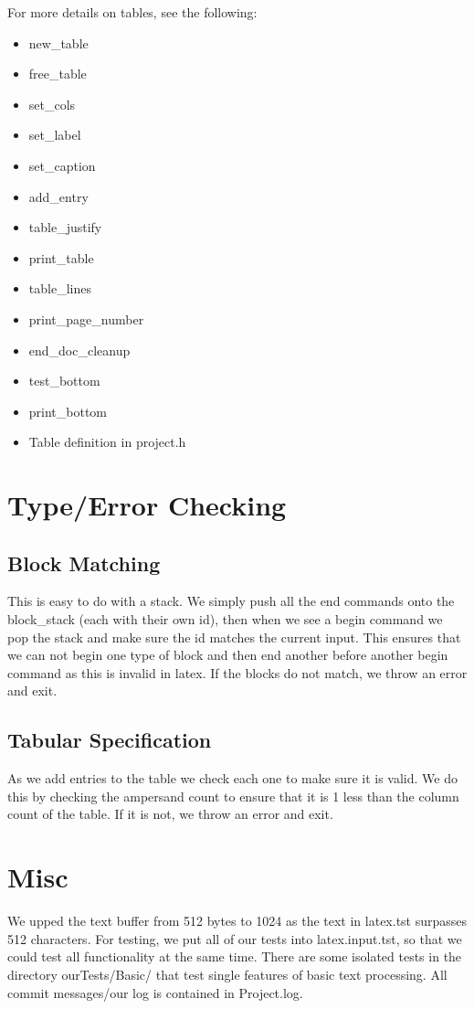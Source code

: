For more details on tables, see the following:
\begin{itemize}
\item new_table
\item free_table
\item set_cols
\item set_label
\item set_caption
\item add_entry
\item table_justify
\item print_table
\item table_lines
\item print_page_number
\item end_doc_cleanup
\item test_bottom
\item print_bottom
\item Table definition in project.h
\end{itemize}

\section{Type/Error Checking}

\subsection{Block Matching}
This is easy to do with a stack. We simply push all the end commands onto the block_stack
(each with their own id), then when we see a begin command we pop the stack and make sure
the id matches the current input. This ensures that we can not begin one type of block and
then end another before another begin command as this is invalid in latex. If the blocks
do not match, we throw an error and exit.

\subsection{Tabular Specification}
As we add entries to the table we check each one to make sure it is valid. We do this by
checking the ampersand count to ensure that it is 1 less than the column count of the
table. If it is not, we throw an error and exit.

\section{Misc}
We upped the text buffer from 512 bytes to 1024 as the text in latex.tst surpasses 512
characters. For testing, we put all of our tests into latex.input.tst, so that we could test all functionality at the same time. There are some isolated tests in the directory ourTests/Basic/ that test single features of basic text processing. All commit messages/our log is contained in Project.log.


